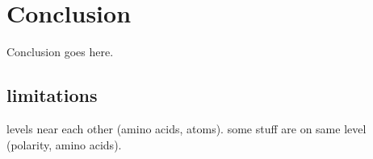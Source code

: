 \documentclass[review,journal]{vgtc}         %
\begin{document}
\section{Conclusion}

Conclusion goes here.

\subsection{limitations}
levels near each other (amino acids, atoms).
some stuff are on same level (polarity, amino acids).





\end{document}
